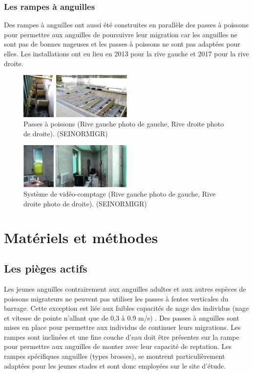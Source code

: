 \documentclass[11pt,titlepage,twoside]{article}\usepackage[]{graphicx}\usepackage[table]{xcolor}
\begin{document}
\subsubsection{Les rampes à anguilles }

Des rampes à anguilles ont aussi été construites en parallèle des passes à poissons pour permettre aux anguilles de poursuivre leur migration car les anguilles ne sont pas de bonnes nageuses et les passes à poissons ne sont pas adaptées pour elles. Les installations ont eu lieu en 2013 pour la rive gauche et 2017 pour la rive droite.

\begin{figure}[htpb]
\centering
\includegraphics[width=0.5\textwidth]{RD}
\caption{Passes à poissons (Rive gauche photo de gauche, Rive droite photo de droite). (SEINORMIGR)}
\label{RD}
\end{figure}

\begin{figure}[htpb]
\centering
\includegraphics[width=0.5\textwidth]{RG}
\caption{Système de vidéo-comptage (Rive gauche photo de gauche, Rive droite photo de droite). (SEINORMIGR)}
\label{RG}
\end{figure}

\section{Matériels et méthodes}

\subsection{Les pièges actifs }

Les jeunes anguilles contrairement aux anguilles adultes et aux autres espèces de poissons migrateurs ne peuvent pas utiliser les passes à fentes verticales du barrage. Cette exception est liée aux faibles capacités de nage des individus (nage et vitesse de pointe n’allant que de 0,3 à 0.9 m/s) \citep{cowx_enhancing_2003, crivelli_languille_1998}. Des passes à anguilles sont mises en place pour permettre aux individus de continuer leurs migrations. Les rampes sont inclinées et une fine couche d’eau doit être présentes sur la rampe pour permettre aux anguilles de monter avec leur capacité de reptation. Les rampes spécifiques anguilles (types brosses), se montrent particulièrement adaptées pour les jeunes stades et sont donc employées sur le site d’étude. 
\end{document}
